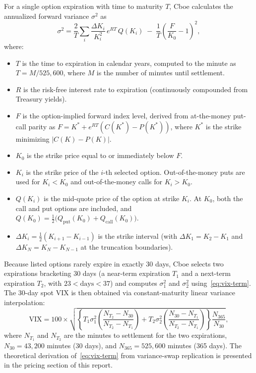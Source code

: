 \documentclass[11pt,a4paper]{article}
\newcommand{\VIX}{\mathrm{VIX}}
\begin{document}
For a single option expiration with time to maturity $T$, Cboe calculates the annualized forward variance $\sigma^2$ as
\begin{equation}
  \sigma^2 = \frac{2}{T}\sum_i \frac{\Delta K_i}{K_i^2}\,e^{RT}\,Q(K_i)\;-\;\frac{1}{T}\left(\frac{F}{K_0}-1\right)^{2},
  \label{eq:vix-term}
\end{equation}
where:
\begin{itemize}
  \item $T$ is the time to expiration in calendar years, computed to the minute as $T = M / 525{,}600$, where $M$ is the number of minutes until settlement.
  \item $R$ is the risk-free interest rate to expiration (continuously compounded from Treasury yields).
  \item $F$ is the option-implied forward index level, derived from at-the-money put-call parity as $F = K^* + e^{RT}(C(K^*) - P(K^*))$, where $K^*$ is the strike minimizing $|C(K) - P(K)|$.
  \item $K_0$ is the strike price equal to or immediately below $F$.
  \item $K_i$ is the strike price of the $i$-th selected option. Out-of-the-money puts are used for $K_i < K_0$ and out-of-the-money calls for $K_i > K_0$.
  \item $Q(K_i)$ is the mid-quote price of the option at strike $K_i$. At $K_0$, both the call and put options are included, and $Q(K_0) = \frac{1}{2}\big(Q_{\text{put}}(K_0) + Q_{\text{call}}(K_0)\big)$.
  \item $\Delta K_i = \frac{1}{2}(K_{i+1} - K_{i-1})$ is the strike interval (with $\Delta K_1 = K_2 - K_1$ and $\Delta K_N = K_N - K_{N-1}$ at the truncation boundaries).
\end{itemize}

Because listed options rarely expire in exactly 30 days, Cboe selects two expirations bracketing 30 days (a near-term expiration $T_1$ and a next-term expiration $T_2$, with $23 < \text{days} < 37$) and computes $\sigma_1^2$ and $\sigma_2^2$ using~\eqref{eq:vix-term}. The 30-day spot VIX is then obtained via constant-maturity linear variance interpolation:
\begin{equation}
  \VIX = 100 \times \sqrt{ \left\{ T_1 \sigma_1^2 \left( \frac{N_{T_2} - N_{30}}{N_{T_2} - N_{T_1}} \right) + T_2 \sigma_2^2 \left( \frac{N_{30} - N_{T_1}}{N_{T_2} - N_{T_1}} \right) \right\} \frac{N_{365}}{N_{30}} },
  \label{eq:vix-interp}
\end{equation}
where $N_{T_1}$ and $N_{T_2}$ are the minutes to settlement for the two expirations, $N_{30} = 43{,}200$ minutes (30 days), and $N_{365} = 525{,}600$ minutes (365 days). The theoretical derivation of~\eqref{eq:vix-term} from variance-swap replication is presented in the pricing section of this report.
\end{document}
